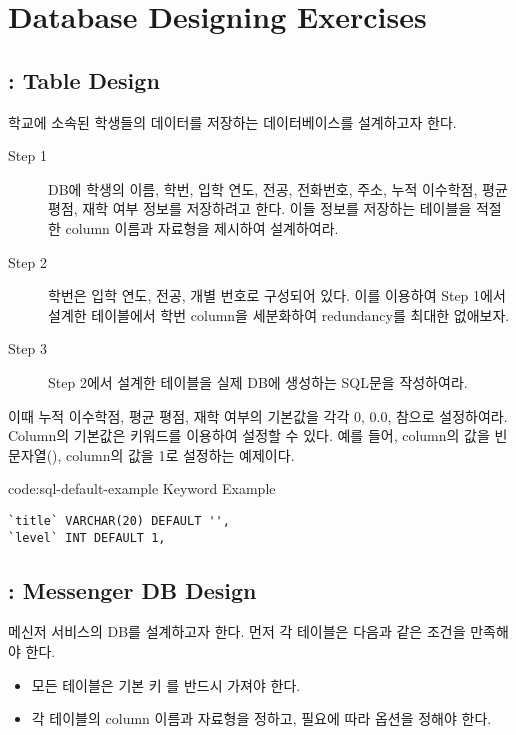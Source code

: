 \section{Database Designing Exercises}\label{sect:db-designing-exercises}

\subsection*{:  Table Design}

학교에 소속된 학생들의 데이터를 저장하는 데이터베이스를 설계하고자 한다.

\begin{description}
    \item[Step 1] DB에 학생의 이름, 학번, 입학 연도, 전공, 전화번호, 주소, 누적 이수학점, 평균 평점, 재학 여부 정보를 저장하려고 한다. 이들 정보를 저장하는 테이블을 적절한 column 이름과 자료형을 제시하여 설계하여라.
    \item[Step 2] 학번은 입학 연도, 전공, 개별 번호로 구성되어 있다. 이를 이용하여 Step 1에서 설계한 테이블에서 학번 column을 세분화하여 redundancy를 최대한 없애보자.
    \item[Step 3] Step 2에서 설계한 테이블을 실제 DB에 생성하는 SQL문을 작성하여라.
\end{description}

이때 누적 이수학점, 평균 평점, 재학 여부의 기본값을 각각 0, 0.0, 참으로 설정하여라. Column의 기본값은  키워드를 이용하여 설정할 수 있다. 예를 들어, \은  column의 값을 빈 문자열(),  column의 값을 1로 설정하는 예제이다.

\begin{code}{code:sql-default-example}{ Keyword Example}
\begin{verbatim}
`title` VARCHAR(20) DEFAULT '',
`level` INT DEFAULT 1,
\end{verbatim}
\end{code}

\subsection*{: Messenger DB Design}

메신저 서비스의 DB를 설계하고자 한다. 먼저 각 테이블은 다음과 같은 조건을 만족해야 한다.

\begin{itemize}
    \item 모든 테이블은 기본 키 를 반드시 가져야 한다.
    \item 각 테이블의 column 이름과 자료형을 정하고, 필요에 따라 옵션을 정해야 한다.
\end{itemize}

